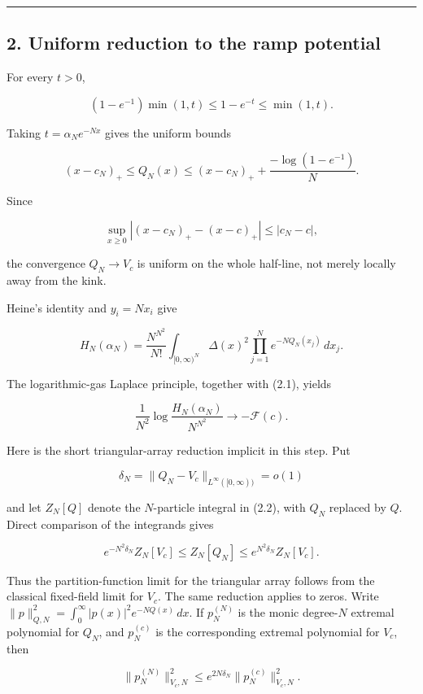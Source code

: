 \documentclass[11pt]{article}
\theoremstyle{keio}
\theoremstyle{definition}
\theoremstyle{remark}
\begin{document}
\begin{center}\rule{0.5\linewidth}{0.5pt}\end{center}

\subsection{2. Uniform reduction to the ramp potential}

For every \(t>0\),

\[
(1-e^{-1})\min(1,t)\le1-e^{-t}\le\min(1,t).
\]

Taking \(t=\alpha_Ne^{-Nx}\) gives the uniform bounds

\[
(x-c_N)_+
\le Q_N(x)
\le(x-c_N)_++\frac{-\log(1-e^{-1})}{N}. \tag{DS-2.1}
\]

Since

\[
\sup_{x\ge0}|(x-c_N)_+-(x-c)_+|\le|c_N-c|,
\]

the convergence \(Q_N\to V_c\) is uniform on the whole half-line, not
merely locally away from the kink.

Heine's identity and \(y_i=Nx_i\) give

\[
H_N(\alpha_N)
=\frac{N^{N^2}}{N!}
\int_{[0,\infty)^N}\Delta(x)^2
\prod_{j=1}^N e^{-NQ_N(x_j)}\,dx_j. \tag{DS-2.2}
\]

The logarithmic-gas Laplace principle, together with (2.1), yields

\[
\frac1{N^2}\log\frac{H_N(\alpha_N)}{N^{N^2}}
\longrightarrow-\mathcal F(c). \tag{DS-2.3}
\]

Here is the short triangular-array reduction implicit in this step. Put

\[
\delta_N=\lVert Q_N-V_c\rVert_{L^\infty([0,\infty))}=o(1)
\]

and let \(Z_N[Q]\) denote the \(N\)-particle integral in (2.2), with
\(Q_N\) replaced by \(Q\). Direct comparison of the integrands gives

\[
e^{-N^2\delta_N}Z_N[V_c]
\le Z_N[Q_N]\le
e^{N^2\delta_N}Z_N[V_c]. \tag{DS-2.4}
\]

Thus the partition-function limit for the triangular array follows from
the classical fixed-field limit for \(V_c\). The same reduction applies to
zeros. Write
\(\lVert p\rVert^2_{Q,N}=\int_0^\infty |p(x)|^2e^{-NQ(x)}\,dx\).
If \(p_N^{(N)}\) is the monic degree-\(N\) extremal polynomial for
\(Q_N\), and \(p_N^{(c)}\) is the corresponding extremal polynomial for
\(V_c\), then

\[
\lVert p_N^{(N)}\rVert^2_{V_c,N}
\le e^{2N\delta_N}
\lVert p_N^{(c)}\rVert^2_{V_c,N}. \tag{DS-2.5}
\]
\end{document}
